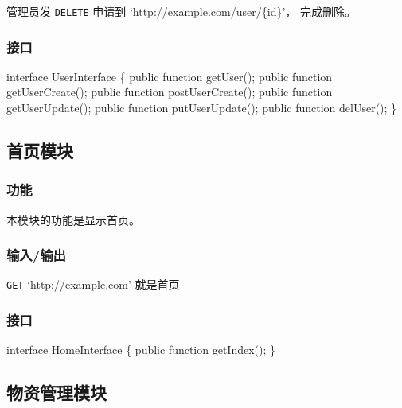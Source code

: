 \documentclass[a4paper,fancyhdr,fntef,hyperref]{ctexart}
\newenvironment{Shaded}{}{}
\newcommand{\NormalTok}[1]{{#1}}
\begin{document}
管理员发 \texttt{DELETE} 申请到 `http://example.com/user/\{id\}'，
完成删除。

\subsubsection{接口}\label{ux63a5ux53e3-1}

\begin{Shaded}
\begin{Highlighting}[]
\NormalTok{interface UserInterface \{}
    \NormalTok{public function getUser();}
    \NormalTok{public function getUserCreate();}
    \NormalTok{public function postUserCreate();}
    \NormalTok{public function getUserUpdate();}
    \NormalTok{public function putUserUpdate();}
    \NormalTok{public function delUser();}
\NormalTok{\}}
\end{Highlighting}
\end{Shaded}

\subsection{首页模块}\label{ux9996ux9875ux6a21ux5757}

\subsubsection{功能}\label{ux529fux80fd-2}

本模块的功能是显示首页。

\subsubsection{输入/输出}\label{ux8f93ux5165ux8f93ux51fa-2}

\texttt{GET} `http://example.com' 就是首页

\subsubsection{接口}\label{ux63a5ux53e3-2}

\begin{Shaded}
\begin{Highlighting}[]
\NormalTok{interface HomeInterface \{}
    \NormalTok{public function getIndex();}
\NormalTok{\}}
\end{Highlighting}
\end{Shaded}

\subsection{物资管理模块}\label{ux7269ux8d44ux7ba1ux7406ux6a21ux5757-1}
\end{document}

